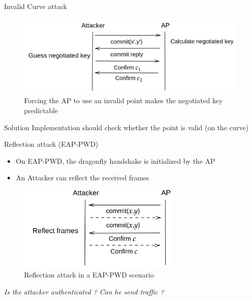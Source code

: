\documentclass[xcolor=table]{bredelebeamer}
\begin{document}
\begin{frame}{Invalid Curve attack}
\begin{figure}
    \centering
   \includegraphics[width=1\textwidth]{invalidcurve.png}
    \caption{Forcing the AP to use an invalid point makes the negotiated key predictable}
    \label{fig:my_label}
\end{figure}
\begin{exampleblock}{Solution}
Implementation should check whether the point is valid (on the curve)
\end{exampleblock}
\end{frame}
\begin{frame}{Reflection attack (EAP-PWD)}
    \begin{itemize}
        \item On EAP-PWD, the dragonfly handshake is initialized by the AP
        \item An Attacker can reflect the received frames
    \end{itemize}
    \begin{figure}
        \centering
        \includegraphics[width=0.7\textwidth]{reflect.png}
        \caption{Reflection attack in a EAP-PWD scenario}
        \label{fig:my_label}
    \end{figure}
    \textit{\large{Is the attacker authenticated ? Can he send traffic ?}}
\end{frame}
\end{document}
